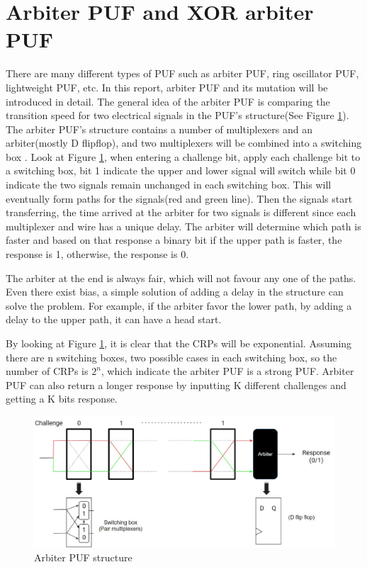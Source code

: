\section{Arbiter PUF and XOR arbiter PUF}
There are many different types of PUF such as arbiter PUF, ring oscillator PUF, lightweight PUF, etc. In this report, arbiter PUF and its mutation will be introduced in detail. The general idea of
the arbiter PUF is comparing the transition speed for two electrical signals in the PUF's structure(See Figure \ref{fig:figure6}). The arbiter PUF's structure contains a number of 
multiplexers and an arbiter(mostly D flipflop), and two multiplexers will be combined into a switching box \cite{Reference3}. Look at Figure \ref{fig:figure6}, when entering a challenge bit, apply each challenge bit to a switching box, bit 1 indicate the upper and lower signal will switch 
while bit 0 indicate the two signals remain unchanged in each switching box. This will eventually form paths for the signals(red and green line). Then the signals start transferring, the time arrived at the arbiter for two signals 
is different since each multiplexer and wire has a unique delay. The arbiter will determine which path is faster and based on that response a binary bit if the upper path is faster, the response is 1, 
otherwise, the response is 0. \par

The arbiter at the end is always fair, which will not favour any one of the paths. Even there exist bias, a simple solution of adding a delay in the structure can solve the problem. For example, if the arbiter favor the lower path,
by adding a delay to the upper path, it can have a head start. 

By looking at Figure \ref{fig:figure6}, it is clear that the CRPs will be exponential. Assuming there are n switching boxes, two possible cases in each switching box, so the 
number of CRPs is $2^{n}$, which indicate the arbiter PUF is a strong PUF. Arbiter PUF can also return a longer response by inputting K different challenges and getting a K bits response.

\begin{figure}[htp]
    \centering
    \includegraphics[width=18cm]{figures/figure6.jpg}
    \caption{Arbiter PUF structure}
    \label{fig:figure6}
    \end{figure}

